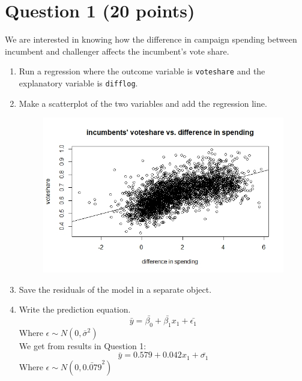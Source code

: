 \documentclass[12pt,letterpaper]{article}
\begin{document}
\section*{Question 1 (20 points)}
\vspace{.25cm}
\noindent We are interested in knowing how the difference in campaign spending between incumbent and challenger affects the incumbent's vote share. 
	\begin{enumerate}
		\item Run a regression where the outcome variable is \texttt{voteshare} and the explanatory variable is \texttt{difflog}.
	    
	    
			\vspace{.5cm}
		
		\item Make a scatterplot of the two variables and add the regression line.
		\begin{figure}[h!]
	    \label{figure1}
	    \includegraphics[width=\textwidth]{Q1.jpeg}
        \end{figure}		
        \vspace{.5cm}
		\item Save the residuals of the model in a separate object.
		
        \vspace{.5cm}		
		\item Write the prediction equation.
		$$\bar{y} = \bar{\beta_0} + \bar{\beta_1}x_1 + \bar{\epsilon_1}$$ Where $\epsilon \sim N(0, \bar{\sigma}^2)$
        \vspace{.5cm}		
		\\We get from results in Question 1:
		$$\bar{y} = 0.579 + 0.042x_1 + \bar{\sigma_1}$$ Where $\epsilon \sim N(0, \bar{0.079}^2)$
	\end{enumerate}
	
\end{document}

